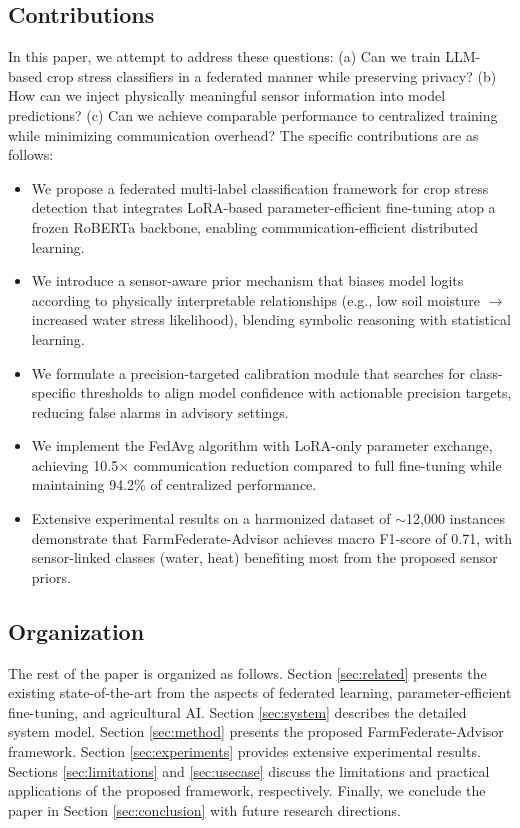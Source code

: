 \documentclass[10pt,journal,compsoc]{IEEEtran}
\begin{document}
\subsection{Contributions}
In this paper, we attempt to address these questions: (a) Can we train LLM-based crop stress classifiers in a federated manner while preserving privacy? (b) How can we inject physically meaningful sensor information into model predictions? (c) Can we achieve comparable performance to centralized training while minimizing communication overhead? The specific contributions are as follows:

\begin{itemize}
    \item We propose a federated multi-label classification framework for crop stress detection that integrates LoRA-based parameter-efficient fine-tuning atop a frozen RoBERTa backbone, enabling communication-efficient distributed learning.

    \item We introduce a sensor-aware prior mechanism that biases model logits according to physically interpretable relationships (e.g., low soil moisture $\rightarrow$ increased water stress likelihood), blending symbolic reasoning with statistical learning.

    \item We formulate a precision-targeted calibration module that searches for class-specific thresholds to align model confidence with actionable precision targets, reducing false alarms in advisory settings.

    \item We implement the FedAvg algorithm with LoRA-only parameter exchange, achieving 10.5$\times$ communication reduction compared to full fine-tuning while maintaining 94.2\% of centralized performance.

    \item Extensive experimental results on a harmonized dataset of $\sim$12,000 instances demonstrate that FarmFederate-Advisor achieves macro F1-score of 0.71, with sensor-linked classes (water, heat) benefiting most from the proposed sensor priors.
\end{itemize}

\subsection{Organization}
The rest of the paper is organized as follows. Section \ref{sec:related} presents the existing state-of-the-art from the aspects of federated learning, parameter-efficient fine-tuning, and agricultural AI. Section \ref{sec:system} describes the detailed system model. Section \ref{sec:method} presents the proposed FarmFederate-Advisor framework. Section \ref{sec:experiments} provides extensive experimental results. Sections \ref{sec:limitations} and \ref{sec:usecase} discuss the limitations and practical applications of the proposed framework, respectively. Finally, we conclude the paper in Section \ref{sec:conclusion} with future research directions.
\end{document}

